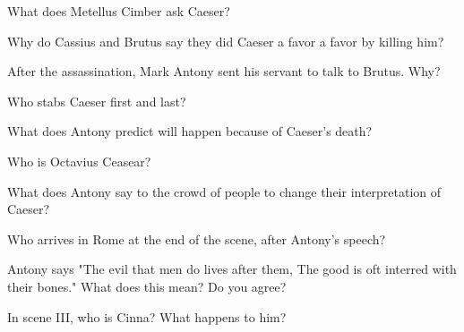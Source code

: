 \documentclass[12pt]{article} %
\begin{document}
    \begin{qstn}
        What does Metellus Cimber ask Caeser?
    \end{qstn}
         \vspace*{2cm}
    \begin{qstn}
      Why do Cassius and Brutus say they did Caeser a favor a favor by killing him?
    \end{qstn}
         \vspace*{4cm}
    \begin{qstn}
      After the assassination, Mark Antony sent his servant to talk to Brutus. Why?
    \end{qstn}
         \vspace*{5cm}
    \begin{qstn}
        Who stabs Caeser first and last?
    \end{qstn}
         \vspace*{2cm}
    \begin{qstn}
       What does Antony predict will happen because of Caeser's death?
    \end{qstn}
         \vspace*{5cm}
    \begin{qstn}
       Who is Octavius Ceasear?
    \end{qstn}
         \vspace*{5cm}
    \begin{qstn}
       What does Antony say to the crowd of people to change their interpretation of Caeser?
    \end{qstn}
    \newpage
    \begin{qstn}
      Who arrives in Rome at the end of the scene, after Antony's speech?
    \end{qstn}
         \vspace*{2cm}
    \begin{qstn}
      Antony says "The evil that men do lives after them, The good is oft interred with their bones." What does this mean? Do you agree?
    \end{qstn}
         \vspace*{10cm}
    \begin{qstn}
      In scene III, who is Cinna? What happens to him?
    \end{qstn}
\end{document}
